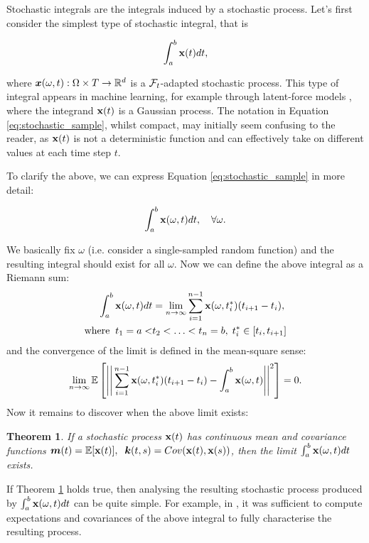 \documentclass[a4paper,12pt,twoside,openright]{report}
\newtheorem{theorem}{Theorem}
\theoremstyle{definition}
\begin{document}
Stochastic integrals are the integrals induced by a stochastic process. Let's first consider the simplest type of stochastic integral, that is

\begin{align} \label{eq:stochastic_sample}
    \int_{a}^{b} {\mathbf{x}}(t) dt,
\end{align}

where ${\bm{x}}(\omega, t): \Omega \times T \rightarrow {\mathbb{R}}^d$ is a ${\mathcal{F}}_t$-adapted stochastic process. This type of integral appears in machine learning, for example through latent-force models \citep{alvarez2009latent,alvarez2013linear}, where the integrand ${\mathbf{x}}(t)$ is a Gaussian process. The notation in Equation \ref{eq:stochastic_sample}, whilst compact, may initially seem confusing to the reader, as ${\mathbf{x}}(t)$ is not a deterministic function and can effectively take on different values at each time step $t$.

To clarify the above, we can express  Equation \ref{eq:stochastic_sample} in more detail:

\begin{align*}
    \int_{a}^{b} {\mathbf{x}}(\omega, t) dt, \quad \forall \omega.
\end{align*}

We basically fix $\omega$ (i.e. consider a single-sampled random function) and the resulting integral should exist for all $\omega$.  Now we can define the above integral as a Riemann sum:
\begin{align*}
    \int_{a}^{b} {\mathbf{x}}(\omega, t) dt &= \lim_{ n \rightarrow \infty} \sum_{i=1}^{n-1} {\mathbf{x}}(\omega, t_i^{*}) (t_{i+1} - t_i), \\
    \text{where} \;\; t_1 = a < &t_2 < \hdots < t_n = b, \;  t_i^{*} \in [ t_i, t_{i+1}]
\end{align*}
and the convergence of the limit is defined in the mean-square sense:
\begin{align*}
    \lim_{n \rightarrow \infty} \mathbb{E} \left[ \Bigg|\Bigg|\sum_{i=1}^{n-1} {\mathbf{x}}(\omega, t_i^{*}) (t_{i+1} - t_i)-  \int_{a}^{b} {\mathbf{x}}(\omega, t) \Bigg|\Bigg|^2\right] =  0.
\end{align*}
Now it remains to discover when the above limit exists:
\begin{theorem}\label{thrm:ito_simple}
  If a stochastic process ${\mathbf{x}}(t)$ has continuous mean and covariance functions ${\bm{m}}(t) = \mathbb{E}[{\mathbf{x}}(t)],\;\; {\bm{k}}(t, s) = Cov({\mathbf{x}}(t), {\mathbf{x}}(s))$, then the limit $\int_{a}^{b} {\mathbf{x}}(\omega, t) dt$ exists.
\end{theorem}
If Theorem \ref{thrm:ito_simple} holds true, then analysing the resulting stochastic process produced by $\int_{a}^{b} {\mathbf{x}}(\omega, t) dt$ can be quite simple. For example, in \cite{alvarez2009latent}, it was sufficient to compute expectations and covariances of the above integral to fully characterise the resulting process.
 
\end{document}
